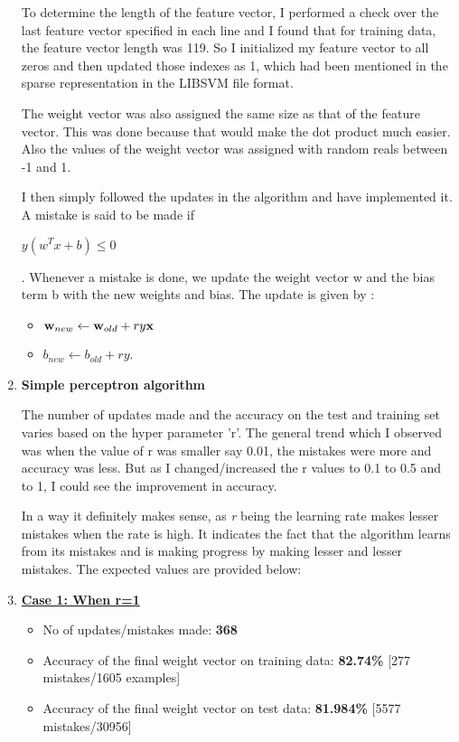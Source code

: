 \documentclass[12pt, fullpage,letterpaper]{article}
\newcommand{\bw}{{\bf w}}
\newcommand{\bx}{{\bf x}}
\begin{document}
\begin{enumerate}
		To determine the length of the feature vector, I performed a check over the last feature vector specified in each line and I found that for training data, the feature vector length was 119. So I initialized my feature vector to all zeros and then updated those indexes as 1, which had been mentioned in the sparse representation in the LIBSVM file format.
		
		The weight vector was also assigned the same size as that of the feature vector. This was done because that would make the dot product much easier. Also the values of the weight vector was assigned with random reals between -1 and 1.
		
		I then simply followed the updates in the algorithm and have implemented it. A mistake is said to be made if 
		\begin{center}
			$y (w^T x + b) \leq 0$
		\end{center}. Whenever a mistake is done, we update the weight vector w and the bias term b with the new weights and bias. The update is given by : \\
		
		  \begin{itemize}
		  	\item[] $\bw_{new} \leftarrow \bw_{old} + r y \bx$
		  	\item[] $b_{new} \leftarrow b_{old} + r y$.
		  \end{itemize}
		
		\item[] \textbf{Simple perceptron algorithm }
		
		The number of updates made and the accuracy on the test and training set varies based on the hyper parameter 'r'.
		The general trend which I observed was when the value of r was smaller say 0.01, the mistakes were more and accuracy was less. But as I changed/increased the r values to 0.1 to 0.5 and to 1, I could see the improvement in accuracy.
		
		In a way it definitely makes sense, as \emph r being the learning rate makes lesser mistakes when the rate is high. It indicates the fact that the algorithm learns from its mistakes and is making progress by making lesser and lesser mistakes. The expected values are provided below:
		
		\item[] \textbf {\underline{ Case 1: When r=1}}
		\begin{itemize}
			\item No of updates/mistakes made: \textbf{368} 
			\item Accuracy of the final weight vector on training data: \textbf{82.74\%} [277 mistakes/1605 examples]
			\item Accuracy of the final weight vector on test data: \textbf{81.984\%} [5577 mistakes/30956]
		\end{itemize}
		

\end{enumerate}
\end{document}
